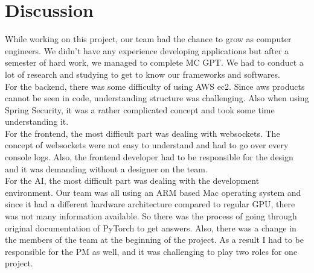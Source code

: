 \documentclass[conference]{IEEEtran}
\begin{document}
\section{Discussion}
    While working on this project, our team had the chance to grow as computer engineers. We didn't have any experience developing applications but after a semester of hard work, we managed to complete MC GPT. We had to conduct a lot of research and studying to get to know our frameworks and softwares.\\
    For the backend, there was some difficulty of using AWS ec2. Since aws products cannot be seen in code, understanding structure was challenging. Also when using Spring Security, it was a rather complicated concept and took some time understanding it.\\
    For the frontend, the most difficult part was dealing with websockets. The concept of websockets were not easy to understand and had to go over every console logs. Also, the frontend developer had to be responsible for the design and it was demanding without a designer on the team.\\
    For the AI, the most difficult part was dealing with the development environment. Our team was all using an ARM based Mac operating system and since it had a different hardware architecture compared to regular GPU, there was not many information available. So there was the process of going through original documentation of PyTorch to get answers. Also, there was a change in the members of the team at the beginning of the project. As a result I had to be responsible for the PM as well, and it was challenging to play two roles for one project.
    
\tableofcontents
\listoftables
\listoffigures
\end{document}
